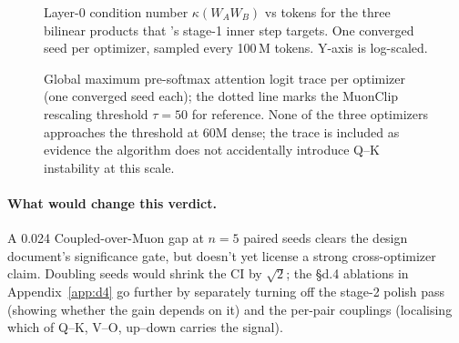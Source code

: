 \begin{figure}[h]
\centering
{}
\caption{Layer-0 condition number $\kappa(W_A W_B)$ vs tokens for the three bilinear products that \optCoupled{}'s stage-1 inner step targets. One converged seed per optimizer, sampled every 100\,M tokens. Y-axis is log-scaled.}\label{fig:stage1-kappa}
\end{figure}

\begin{figure}[h]
\centering
{}
\caption{Global maximum pre-softmax attention logit trace per optimizer (one converged seed each); the dotted line marks the MuonClip rescaling threshold $\tau=50$ \citep{moonshot2025kimi} for reference. None of the three optimizers approaches the threshold at 60M dense; the trace is included as evidence the algorithm does not accidentally introduce Q--K instability at this scale.}\label{fig:stage1-attn-logit}
\end{figure}

\paragraph{What would change this verdict.}
A 0.024\nats{} Coupled-over-Muon gap at $n{=}5$ paired seeds clears the design document's significance gate, but doesn't yet license a strong cross-optimizer claim. Doubling seeds would shrink the CI by $\sqrt{2}$; the \S d.4 ablations in Appendix~\ref{app:d4} go further by separately turning off the stage-2 polish pass (showing whether the gain depends on it) and the per-pair couplings (localising which of Q--K, V--O, up--down carries the signal).
